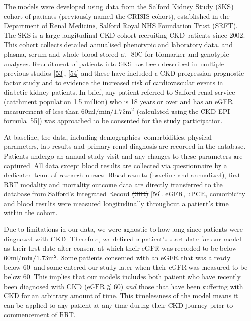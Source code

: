 \documentclass[
]{article}
\begin{document}
The models were developed using data from the Salford Kidney Study (SKS) cohort of patients (previously named the CRISIS cohort), established in the Department of Renal Medicine, Salford Royal NHS Foundation Trust (SRFT). The SKS is a large longitudinal CKD cohort recruiting CKD patients since 2002. This cohort collects detailed annualised phenotypic and laboratory data, and plasma, serum and whole blood stored at -80\textdegree C for biomarker and genotypic analyses. Recruitment of patients into SKS has been described in multiple previous studies {[}\protect\hyperlink{ref-hoefield_factors_2010}{53}{]}, {[}\protect\hyperlink{ref-chinnadurai_increased_2019-1}{54}{]} and these have included a CKD progression prognostic factor study and to evidence the increased risk of cardiovascular events in diabetic kidney patients. In brief, any patient referred to Salford renal service (catchment population 1.5 million) who is 18 years or over and has an eGFR measurement of less than \(60\textrm{ml}/\textrm{min}/1.73\textrm{m}^2\) (calculated using the CKD-EPI formula {[}\protect\hyperlink{ref-levey_new_2009}{55}{]}) was approached to be consented for the study participation.

At baseline, the data, including demographics, comorbidities, physical parameters, lab results and primary renal diagnosis are recorded in the database. Patients undergo an annual study visit and any changes to these parameters are captured. All data except blood results are collected via questionnaire by a dedicated team of research nurses. Blood results (baseline and annualised), first RRT modality and mortality outcome data are directly transferred to the database from Salford's Integrated Record \sout{(SIR)} {[}\protect\hyperlink{ref-new_obtaining_2014}{56}{]}. eGFR, uPCR, comorbidity and blood results were measured longitudinally throughout a patient's time within the cohort.

Due to limitations in our data, we were agnostic to how long since patients were diagnosed with CKD. Therefore, we defined a patient's start date for our model as their first date after consent at which their eGFR was recorded to be below \(60\textrm{ml}/\textrm{min}/1.73\textrm{m}^2\). Some patients consented with an eGFR that was already below 60, and some entered our study later when their eGFR was measured to be below 60. This implies that our models includes both patient who have recently been diagnosed with CKD (\(\textrm{eGFR} \lessapprox 60\)) \emph{and} those that have been suffering with CKD for an arbitrary amount of time. This timelessness of the model means it can be applied to any patient at any time during their CKD journey prior to commencement of RRT.
\end{document}
